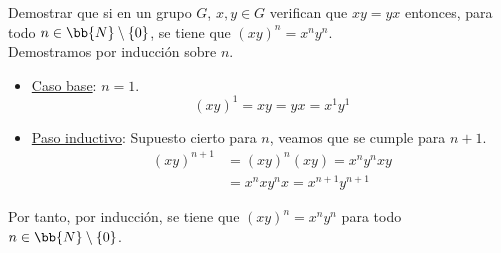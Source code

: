 \begin{ejercicio}\label{ej:2.8}
    Demostrar que si en un grupo $G$, $x, y \in G$ verifican que $xy = yx$ entonces, para todo $n \in \bb{N}\setminus \{0\}$, se tiene que $(xy)^n = x^ny^n$.\\

    Demostramos por inducción sobre $n$.
    \begin{itemize}
        \item \ul{Caso base}: $n = 1$.
        \begin{equation*}
            (xy)^1 = xy = yx = x^1y^1
        \end{equation*}

        \item \ul{Paso inductivo}: Supuesto cierto para $n$, veamos que se cumple para $n+1$.
        \begin{align*}
            (xy)^{n+1}
            &= (xy)^n(xy) = x^ny^nxy\\
            &= x^nxy^nx = x^{n+1}y^{n+1}
        \end{align*}
    \end{itemize}
    Por tanto, por inducción, se tiene que $(xy)^n = x^ny^n$ para todo $n \in \bb{N}\setminus \{0\}$.
\end{ejercicio}

